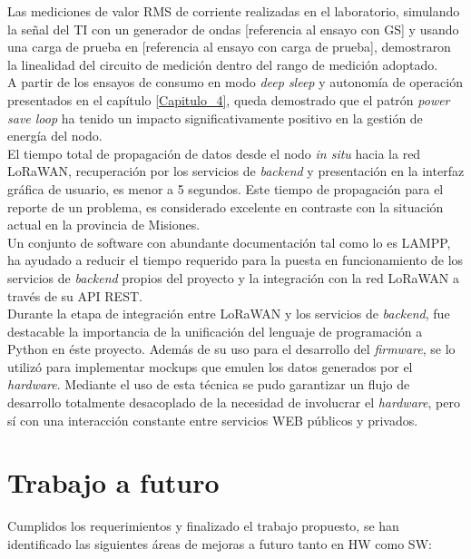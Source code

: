 Las mediciones de valor RMS de corriente realizadas en el laboratorio, simulando la señal del TI con un generador de ondas [referencia al ensayo con GS] y usando una carga de prueba en [referencia al ensayo con carga de prueba], demostraron la linealidad del circuito de medición dentro del rango de medición adoptado.\\
A partir de los ensayos de consumo en modo \textit{deep sleep} y autonomía de operación presentados en el capítulo \ref{Capitulo_4}, queda demostrado que el patrón \textit{power save loop} ha tenido un impacto significativamente positivo en la gestión de energía del nodo.\\
El tiempo total de propagación de datos desde el nodo \textit{in situ} hacia la red LoRaWAN, recuperación por los servicios de \textit{backend} y presentación en la interfaz gr\'{a}fica de usuario, es menor a 5 segundos. Este tiempo de propagación para el reporte de un problema, es considerado excelente en contraste con la situación actual en la provincia de Misiones.\\
Un conjunto de software con abundante documentación tal como lo es LAMPP, ha ayudado a reducir el tiempo requerido para la puesta en funcionamiento de los servicios de \textit{backend} propios del proyecto y la integración con la red LoRaWAN a través de su API REST.\\
Durante la etapa de integración entre LoRaWAN y los servicios de \textit{backend}, fue destacable la importancia de la unificación del lenguaje de programación a Python en \'{e}ste proyecto. Además de su uso para el desarrollo del \textit{firmware}, se lo utilizó para implementar mockups que emulen los datos generados por el \textit{hardware}. Mediante el uso de esta técnica se pudo garantizar un flujo de desarrollo totalmente desacoplado de la necesidad de involucrar el \textit{hardware}, pero sí con una interacción constante entre servicios WEB públicos y privados.\\


\section{Trabajo a futuro}

Cumplidos los requerimientos y finalizado el trabajo propuesto, se han identificado las siguientes áreas de mejoras a futuro tanto en HW como SW:

